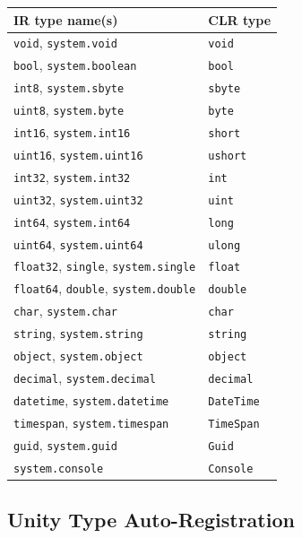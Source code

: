 \documentclass[11pt,a4paper]{article}
\newcommand{\code}[1]{\texttt{\small #1}}
\begin{document}
\begin{longtable}{ll}
  \toprule
  \textbf{IR type name(s)} & \textbf{CLR type} \\
  \midrule
  \endhead
  \code{void}, \code{system.void}           & \code{void} \\
  \code{bool}, \code{system.boolean}        & \code{bool} \\
  \code{int8}, \code{system.sbyte}          & \code{sbyte} \\
  \code{uint8}, \code{system.byte}          & \code{byte} \\
  \code{int16}, \code{system.int16}         & \code{short} \\
  \code{uint16}, \code{system.uint16}       & \code{ushort} \\
  \code{int32}, \code{system.int32}         & \code{int} \\
  \code{uint32}, \code{system.uint32}       & \code{uint} \\
  \code{int64}, \code{system.int64}         & \code{long} \\
  \code{uint64}, \code{system.uint64}       & \code{ulong} \\
  \code{float32}, \code{single}, \code{system.single} & \code{float} \\
  \code{float64}, \code{double}, \code{system.double} & \code{double} \\
  \code{char}, \code{system.char}           & \code{char} \\
  \code{string}, \code{system.string}       & \code{string} \\
  \code{object}, \code{system.object}       & \code{object} \\
  \code{decimal}, \code{system.decimal}     & \code{decimal} \\
  \code{datetime}, \code{system.datetime}   & \code{DateTime} \\
  \code{timespan}, \code{system.timespan}   & \code{TimeSpan} \\
  \code{guid}, \code{system.guid}           & \code{Guid} \\
  \code{system.console}                     & \code{Console} \\
  \bottomrule
\end{longtable}

\subsection{Unity Type Auto-Registration}
\end{document}
